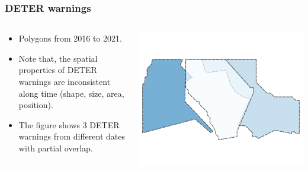 \documentclass[aspectratio=169]{beamer}
\begin{document}





\begin{frame}
    \frametitle{DETER warnings}
    \begin{columns}
        \begin{column}{0.5\textwidth}
            \begin{itemize}
                \item Polygons from 2016 to 2021.
                \item Note that, the spatial properties of DETER warnings are
                    inconsistent along time (shape, size, area, position).
                \item The figure shows 3 DETER warnings from different dates
                    with partial overlap.
            \end{itemize}
        \end{column}
        \begin{column}{0.5\textwidth}
            \includegraphics[width=0.99\linewidth]
            {./images/sample_deter_warnings.png}
        \end{column}
    \end{columns}
\end{frame}
\end{document}
